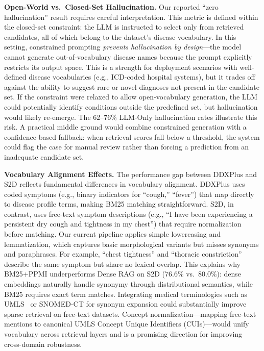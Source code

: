\documentclass[runningheads]{llncs}
\begin{document}
\textbf{Open-World vs.\ Closed-Set Hallucination.}
Our reported ``zero hallucination'' result requires careful interpretation. This metric is defined within the closed-set constraint: the LLM is instructed to select only from retrieved candidates, all of which belong to the dataset's disease vocabulary. In this setting, constrained prompting \emph{prevents hallucination by design}---the model cannot generate out-of-vocabulary disease names because the prompt explicitly restricts its output space. This is a strength for deployment scenarios with well-defined disease vocabularies (e.g., ICD-coded hospital systems), but it trades off against the ability to suggest rare or novel diagnoses not present in the candidate set. If the constraint were relaxed to allow open-vocabulary generation, the LLM could potentially identify conditions outside the predefined set, but hallucination would likely re-emerge. The 62--76\% LLM-Only hallucination rates illustrate this risk. A practical middle ground would combine constrained generation with a confidence-based fallback: when retrieval scores fall below a threshold, the system could flag the case for manual review rather than forcing a prediction from an inadequate candidate set.

\textbf{Vocabulary Alignment Effects.}
The performance gap between DDXPlus and S2D reflects fundamental differences in vocabulary alignment. DDXPlus uses coded symptoms (e.g., binary indicators for ``cough,'' ``fever'') that map directly to disease profile terms, making BM25 matching straightforward. S2D, in contrast, uses free-text symptom descriptions (e.g., ``I have been experiencing a persistent dry cough and tightness in my chest'') that require normalization before matching. Our current pipeline applies simple lowercasing and lemmatization, which captures basic morphological variants but misses synonyms and paraphrases. For example, ``chest tightness'' and ``thoracic constriction'' describe the same symptom but share no lexical overlap. This explains why BM25+PPMI underperforms Dense RAG on S2D (76.6\% vs.\ 80.0\%): dense embeddings naturally handle synonymy through distributional semantics, while BM25 requires exact term matches. Integrating medical terminologies such as UMLS~\cite{bodenreider2004unified} or SNOMED-CT for synonym expansion could substantially improve sparse retrieval on free-text datasets. Concept normalization---mapping free-text mentions to canonical UMLS Concept Unique Identifiers (CUIs)---would unify vocabulary across retrieval layers and is a promising direction for improving cross-domain robustness.
\end{document}
